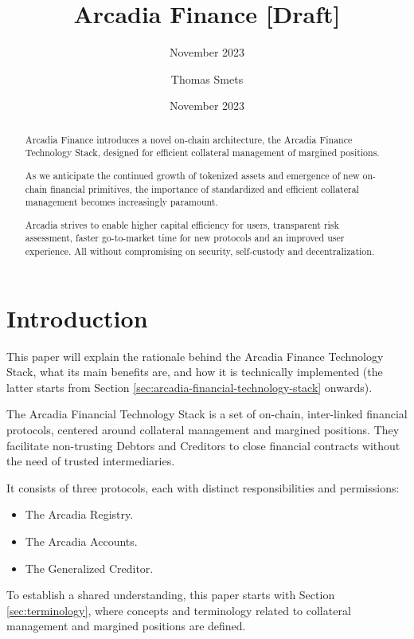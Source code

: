 \documentclass[sigconf,nonacm]{acmart}
\title{Arcadia Finance [Draft]}
\subtitle{November 2023}
\date{November 2023}
\author{Thomas Smets}
\affiliation{
    \institution{Arcadia Finance}
    \city{Brussels}
    \country{Belgium}
}
\begin{document}
\begin{abstract}
    Arcadia Finance introduces a novel on-chain architecture, the Arcadia Finance Technology Stack,
    designed for efficient collateral management of margined positions.

    As we anticipate the continued growth of tokenized assets and emergence of new on-chain financial primitives, 
    the importance of standardized and efficient collateral management becomes increasingly paramount.

    Arcadia strives to enable higher capital efficiency for users, transparent risk assessment,
    faster go-to-market time for new protocols and an improved user experience.
    All without compromising on security, self-custody and decentralization.
\end{abstract}


\maketitle

\section{Introduction} 
\label{sec:introduction}
This paper will explain the rationale behind the Arcadia Finance Technology Stack, what its main benefits are,
and how it is technically implemented (the latter starts from Section \ref{sec:arcadia-financial-technology-stack} onwards).

The Arcadia Financial Technology Stack is a set of on-chain, inter-linked financial protocols,
centered around collateral management and margined positions.
They facilitate non-trusting Debtors and Creditors to close financial contracts without the need of trusted intermediaries.

It consists of three protocols, each with distinct responsibilities and permissions:
\begin{itemize}
\item The Arcadia Registry.
\item The Arcadia Accounts.
\item The Generalized Creditor.
\end{itemize}

To establish a shared understanding, this paper starts with Section \ref{sec:terminology},
where concepts and terminology related to collateral management and margined positions are defined.
\end{document}
